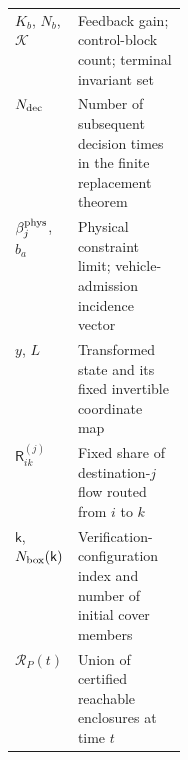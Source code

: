 \documentclass[preprint,12pt]{elsarticle}
\theoremstyle{definition}
\theoremstyle{plain}
\theoremstyle{definition}
\theoremstyle{plain}
\begin{document}
\begin{longtable}{@{}p{0.20\linewidth}>{\raggedright\arraybackslash}p{}@{}}
$K_b$, $N_b$, $\mathcal K$ & Feedback gain; control-block count; terminal invariant set\\
$N_{\rm dec}$ & Number of subsequent decision times in the finite replacement theorem\\
$\beta_j^{\rm phys}$, $b_a$ & Physical constraint limit; vehicle-admission incidence vector\\
$y$, $L$ & Transformed state and its fixed invertible coordinate map\\
$\mathsf R_{ik}^{(j)}$ & Fixed share of destination-$j$ flow routed from $i$ to $k$\\
$\mathsf k$, $N_{\rm box}(\mathsf k)$ & Verification-configuration index and number of initial cover members\\
$\mathcal R_P(t)$ & Union of certified reachable enclosures at time $t$\\


\end{longtable}
\end{document}
